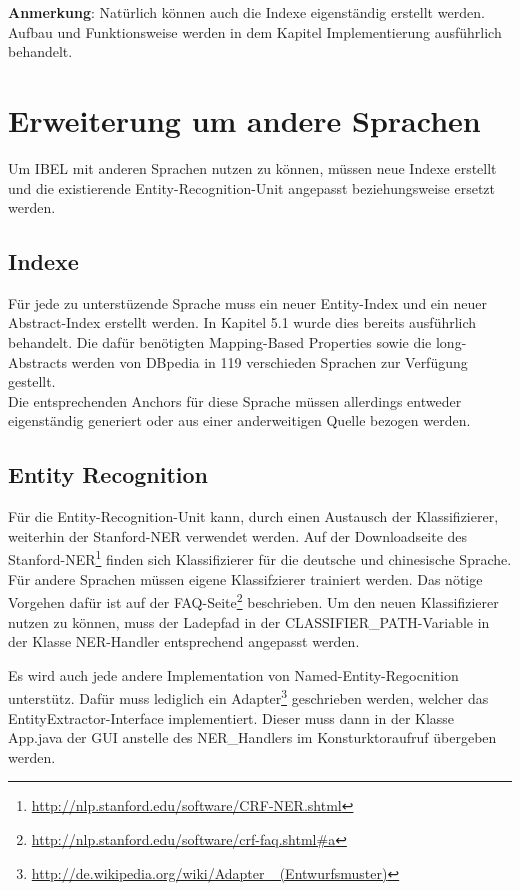 \documentclass[11pt, a4paper, oneside]{Thesis} %
\begin{document}
\textbf{Anmerkung}: Nat\"urlich k\"onnen auch die Indexe eigenst\"andig erstellt werden. Aufbau und Funktionsweise werden in dem Kapitel \glqq Implementierung \grqq ausf\"uhrlich behandelt.
\section{Erweiterung um andere Sprachen}
Um IBEL mit anderen Sprachen nutzen zu k\"onnen, m\"ussen neue Indexe erstellt und die existierende Entity-Recognition-Unit angepasst beziehungsweise ersetzt werden.

\subsection{Indexe}
F\"ur jede zu unterst\"uzende Sprache muss ein neuer Entity-Index und ein neuer Abstract-Index erstellt werden. In Kapitel 5.1 wurde dies bereits ausf\"uhrlich behandelt.
Die daf\"ur ben\"otigten Mapping-Based Properties sowie die long-Abstracts werden von DBpedia in 119 verschieden Sprachen zur Verf\"ugung gestellt. \\
Die entsprechenden Anchors f\"ur diese Sprache müssen allerdings entweder eigenst\"andig generiert oder aus einer anderweitigen Quelle bezogen werden.
\clearpage
\subsection{Entity Recognition}
F\"ur die Entity-Recognition-Unit kann, durch einen Austausch der Klassifizierer, weiterhin der Stanford-NER verwendet werden.  
Auf der Downloadseite des Stanford-NER\footnote{\url{http://nlp.stanford.edu/software/CRF-NER.shtml}} finden sich Klassifizierer f\"ur die deutsche und chinesische Sprache. F\"ur andere Sprachen m\"ussen eigene Klassifzierer trainiert werden. Das n\"otige Vorgehen daf\"ur ist auf der FAQ-Seite\footnote{\url{http://nlp.stanford.edu/software/crf-faq.shtml\#a}} beschrieben. Um den neuen Klassifizierer nutzen zu k\"onnen, muss der Ladepfad in der CLASSIFIER\_PATH-Variable in der Klasse NER-Handler entsprechend angepasst werden.

Es wird auch jede andere Implementation von Named-Entity-Regocnition unterst\"utz. Daf\"ur muss lediglich ein  Adapter\footnote{\url{http://de.wikipedia.org/wiki/Adapter
\_(Entwurfsmuster)}} geschrieben werden, welcher das EntityExtractor-Interface implementiert. Dieser muss dann in der Klasse App.java der GUI anstelle des NER\_Handlers im Konsturktoraufruf \"ubergeben werden.
\end{document}
